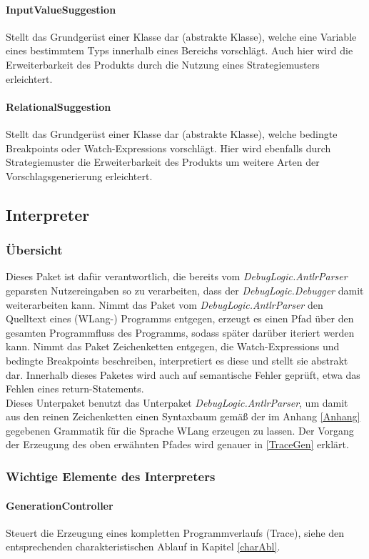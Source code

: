 \documentclass[parskip=full]{scrartcl}
\begin{document}
\paragraph{InputValueSuggestion}
Stellt das Grundgerüst einer Klasse dar (abstrakte Klasse), welche eine Variable eines bestimmtem Typs innerhalb eines Bereichs vorschlägt. Auch hier wird die Erweiterbarkeit des Produkts durch die Nutzung eines Strategiemusters erleichtert.
\paragraph{RelationalSuggestion}
Stellt das Grundgerüst einer Klasse dar (abstrakte Klasse), welche bedingte Breakpoints oder Watch-Expressions vorschlägt. Hier wird ebenfalls durch Strategiemuster die Erweiterbarkeit des Produkts um weitere Arten der Vorschlagsgenerierung erleichtert.


\subsection{Interpreter}
\subsubsection{Übersicht}
Dieses Paket ist dafür verantwortlich, die bereits vom \textit{DebugLogic.AntlrParser}  geparsten Nutzereingaben so zu verarbeiten, dass der \textit{DebugLogic.Debugger} damit weiterarbeiten kann. Nimmt das Paket vom \textit{DebugLogic.AntlrParser} den Quelltext eines (WLang-) Programms entgegen, erzeugt es einen Pfad über den gesamten Programmfluss des Programms, sodass später darüber iteriert werden kann. Nimmt das Paket Zeichenketten entgegen, die Watch-Expressions und bedingte Breakpoints beschreiben, interpretiert es diese und stellt sie abstrakt dar.
Innerhalb dieses Paketes wird auch auf semantische Fehler geprüft, etwa das Fehlen eines return-Statements.\\
Dieses Unterpaket benutzt das Unterpaket \textit{DebugLogic.AntlrParser}, um damit aus den reinen Zeichenketten einen Syntaxbaum gemäß der im Anhang \ref{Anhang} gegebenen Grammatik für die Sprache WLang erzeugen zu lassen.
Der Vorgang der Erzeugung des oben erwähnten Pfades wird genauer in \ref{TraceGen} erklärt.
\subsubsection{Wichtige Elemente des Interpreters}
\paragraph{GenerationController}
Steuert die Erzeugung eines kompletten Programmverlaufs (Trace), siehe den entsprechenden charakteristischen Ablauf in Kapitel \ref{charAbl}.
\end{document}

